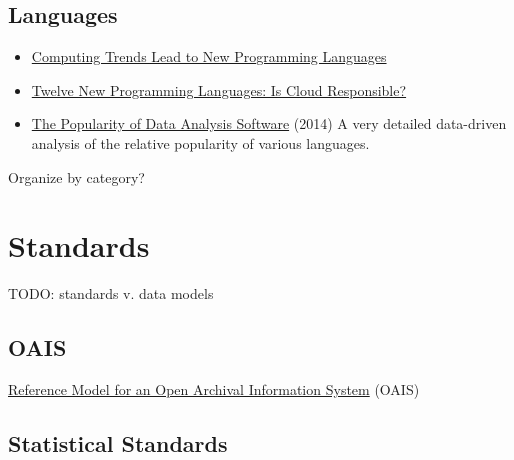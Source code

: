 \documentclass[reqno,12pt]{tufte-book}
\numberwithin{equation}{subsection}
\begin{document}
\section{Languages}
\label{sect:langs}

\begin{itemize}
\item \href{http://ieeexplore.ieee.org/xpl/articleDetails.jsp?arnumber=6228573}{Computing Trends Lead to New Programming Languages}
\item \href{http://cloudcomputing.sys-con.com/node/2265359}{Twelve New Programming Languages: Is Cloud Responsible?}
\item \href{http://r4stats.com/articles/popularity/}{The Popularity of Data Analysis Software} (2014) A very detailed data-driven analysis of the relative popularity of various languages.
\end{itemize}

\begin{remark}
  Organize by category?
\end{remark}

\chapter{Standards}

\begin{ednote}
  TODO: standards v. data models
\end{ednote}

\section{OAIS}
\label{sect:oais}

\href{http://public.ccsds.org/publications/archive/650x0m2.pdf}{Reference
  Model for an Open Archival Information System} (OAIS)

\section{Statistical Standards}
\label{sect:statsstd}
\end{document}
